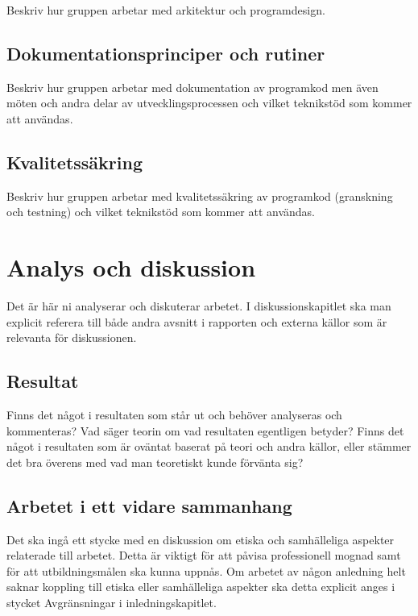 \documentclass[a4paper,12pt,oneside,final]{extbook}
\begin{document}
Beskriv hur gruppen arbetar med arkitektur och programdesign.

\section{Dokumentationsprinciper och rutiner}

Beskriv hur gruppen arbetar med dokumentation av programkod men även
möten och andra delar av utvecklingsprocessen och vilket teknikstöd
som kommer att användas.

\section{Kvalitetssäkring}

Beskriv hur gruppen arbetar med kvalitetssäkring av programkod
(granskning och testning) och vilket teknikstöd som kommer att
användas.

\chapter{Analys och diskussion}

Det är här ni analyserar och diskuterar arbetet. I diskussionskapitlet
ska man explicit referera till både andra avsnitt i rapporten och
externa källor som är relevanta för diskussionen.


\section{Resultat}

Finns det något i resultaten som står ut och behöver analyseras och
kommenteras? Vad säger teorin om vad resultaten egentligen betyder?
Finns det något i resultaten som är oväntat baserat på teori och andra
källor, eller stämmer det bra överens med vad man teoretiskt kunde
förvänta sig?

\section{Arbetet i ett vidare sammanhang}

Det ska ingå ett stycke med en diskussion om etiska och samhälleliga
aspekter relaterade till arbetet. Detta är viktigt för att påvisa
professionell mognad samt för att utbildningsmålen ska kunna
uppnås. Om arbetet av någon anledning helt saknar koppling till etiska
eller samhälleliga aspekter ska detta explicit anges i stycket
Avgränsningar i inledningskapitlet.
\end{document}
